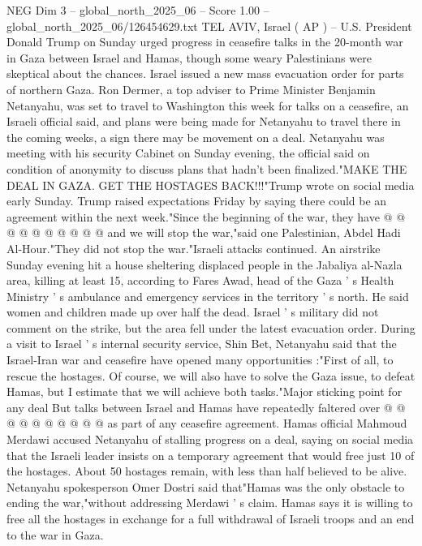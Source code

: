 \begin{textsample}{NEG Dim 3 – global\_north\_2025\_06 – Score 1.00 – global\_north\_2025\_06/126454629.txt}  \label{ex:f3_neg_363}
TEL AVIV, Israel ( AP ) -- U.S.
President Donald Trump on Sunday urged progress in ceasefire talks in the 20-month war in Gaza between Israel and Hamas, though some weary Palestinians were skeptical about the chances.
Israel issued a new mass evacuation order for parts of northern Gaza.
Ron Dermer, a top adviser to Prime Minister Benjamin Netanyahu, was set to travel to Washington this week for talks on a ceasefire, an Israeli official said, and plans were being made for Netanyahu to travel there in the coming weeks, a sign there may be movement on a deal.
Netanyahu was meeting with his security Cabinet on Sunday evening, the official said on condition of anonymity to discuss plans that hadn't been finalized."MAKE THE DEAL IN GAZA.
GET THE HOSTAGES BACK!!!"Trump wrote on social media early Sunday.
Trump raised expectations Friday by saying there could be an agreement within the next week."Since the beginning of the war, they have @ @ @ @ @ @ @ @ @ @ and we will stop the war,"said one Palestinian, Abdel Hadi Al-Hour."They did not stop the war."Israeli attacks continued.
An airstrike Sunday evening hit a house sheltering displaced people in the Jabaliya al-Nazla area, killing at least 15, according to Fares Awad, head of the Gaza ' s Health Ministry ' s ambulance and emergency services in the territory ' s north.
He said women and children made up over half the dead.
Israel ' s military did not comment on the strike, but the area fell under the latest evacuation order.
During a visit to Israel ' s internal security service, Shin Bet, Netanyahu said that the Israel-Iran war and ceasefire have opened many opportunities :"First of all, to rescue the hostages.
Of course, we will also have to solve the Gaza issue, to defeat Hamas, but I estimate that we will achieve both tasks."Major sticking point for any deal But talks between Israel and Hamas have repeatedly faltered over @ @ @ @ @ @ @ @ @ @ as part of any ceasefire agreement.
Hamas official Mahmoud Merdawi accused Netanyahu of stalling progress on a deal, saying on social media that the Israeli leader insists on a temporary agreement that would free just 10 of the hostages.
About 50 hostages remain, with less than half believed to be alive.
Netanyahu spokesperson Omer Dostri said that"Hamas was the only obstacle to ending the war,"without addressing Merdawi ' s claim.
Hamas says it is willing to free all the hostages in exchange for a full withdrawal of Israeli troops and an end to the war in Gaza.

\end{textsample}
